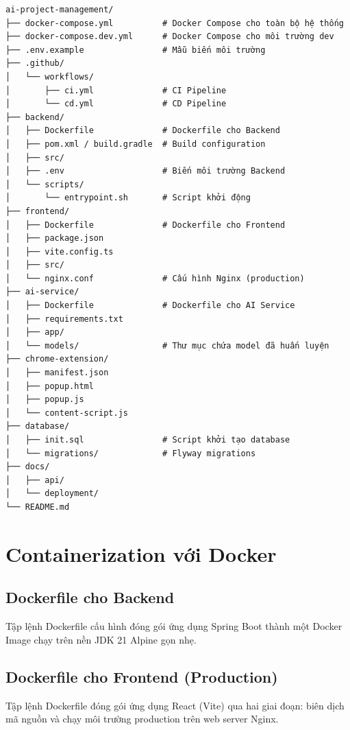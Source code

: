 \documentclass[12pt,a4paper]{report}
\begin{document}
\begin{verbatim}
ai-project-management/
├── docker-compose.yml          # Docker Compose cho toàn bộ hệ thống
├── docker-compose.dev.yml      # Docker Compose cho môi trường dev
├── .env.example                # Mẫu biến môi trường
├── .github/
│   └── workflows/
│       ├── ci.yml              # CI Pipeline
│       └── cd.yml              # CD Pipeline
├── backend/
│   ├── Dockerfile              # Dockerfile cho Backend
│   ├── pom.xml / build.gradle  # Build configuration
│   ├── src/
│   ├── .env                    # Biến môi trường Backend
│   └── scripts/
│       └── entrypoint.sh       # Script khởi động
├── frontend/
│   ├── Dockerfile              # Dockerfile cho Frontend
│   ├── package.json
│   ├── vite.config.ts
│   ├── src/
│   └── nginx.conf              # Cấu hình Nginx (production)
├── ai-service/
│   ├── Dockerfile              # Dockerfile cho AI Service
│   ├── requirements.txt
│   ├── app/
│   └── models/                 # Thư mục chứa model đã huấn luyện
├── chrome-extension/
│   ├── manifest.json
│   ├── popup.html
│   ├── popup.js
│   └── content-script.js
├── database/
│   ├── init.sql                # Script khởi tạo database
│   └── migrations/             # Flyway migrations
├── docs/
│   ├── api/
│   └── deployment/
└── README.md
\end{verbatim}

\section{Containerization với Docker}

\subsection{Dockerfile cho Backend}

Tập lệnh Dockerfile cấu hình đóng gói ứng dụng Spring Boot thành một Docker Image chạy trên nền JDK 21 Alpine gọn nhẹ.

\subsection{Dockerfile cho Frontend (Production)}

Tập lệnh Dockerfile đóng gói ứng dụng React (Vite) qua hai giai đoạn: biên dịch mã nguồn và chạy môi trường production trên web server Nginx.
\end{document}
